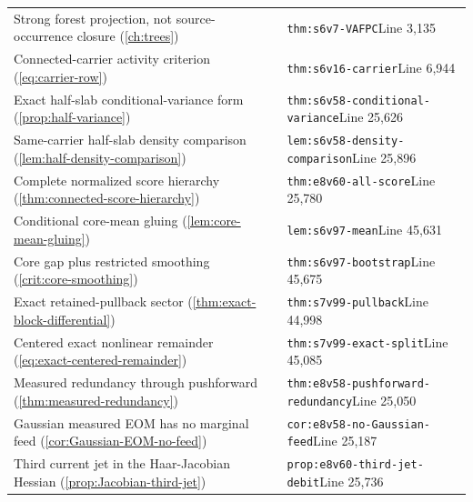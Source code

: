 \documentclass[11pt,oneside,openany]{book}
\theoremstyle{definition}
\theoremstyle{remark}
\begin{document}
\begin{longtable}{L{0.32\textwidth}L{0.12\textwidth}L{0.477\textwidth}}
Strong forest projection, not source-occurrence closure (\cref{ch:trees}) & \cite{F6} & \nolinkurl{thm:s6v7-VAFPC}\newline Line 3,135 \\
Connected-carrier activity criterion (\cref{eq:carrier-row}) & \cite{F6} & \nolinkurl{thm:s6v16-carrier}\newline Line 6,944 \\
Exact half-slab conditional-variance form (\cref{prop:half-variance}) & \cite{F6} & \nolinkurl{thm:s6v58-conditional-variance}\newline Line 25,626 \\
Same-carrier half-slab density comparison (\cref{lem:half-density-comparison}) & \cite{F6} & \nolinkurl{lem:s6v58-density-comparison}\newline Line 25,896 \\
Complete normalized score hierarchy (\cref{thm:connected-score-hierarchy}) & \cite{F8} & \nolinkurl{thm:e8v60-all-score}\newline Line 25,780 \\
Conditional core-mean gluing (\cref{lem:core-mean-gluing}) & \cite{F6} & \nolinkurl{lem:s6v97-mean}\newline Line 45,631 \\
Core gap plus restricted smoothing (\cref{crit:core-smoothing}) & \cite{F6} & \nolinkurl{thm:s6v97-bootstrap}\newline Line 45,675 \\
Exact retained-pullback sector (\cref{thm:exact-block-differential}) & \cite{F7} & \nolinkurl{thm:s7v99-pullback}\newline Line 44,998 \\
Centered exact nonlinear remainder (\cref{eq:exact-centered-remainder}) & \cite{F7} & \nolinkurl{thm:s7v99-exact-split}\newline Line 45,085 \\
Measured redundancy through pushforward (\cref{thm:measured-redundancy}) & \cite{F8} & \nolinkurl{thm:e8v58-pushforward-redundancy}\newline Line 25,050 \\
Gaussian measured EOM has no marginal feed (\cref{cor:Gaussian-EOM-no-feed}) & \cite{F8} & \nolinkurl{cor:e8v58-no-Gaussian-feed}\newline Line 25,187 \\
Third current jet in the Haar-Jacobian Hessian (\cref{prop:Jacobian-third-jet}) & \cite{F8} & \nolinkurl{prop:e8v60-third-jet-debit}\newline Line 25,736 \\

\end{longtable}
\end{document}
